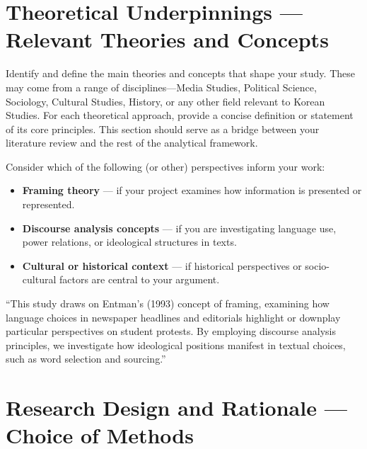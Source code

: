\documentclass[11pt,a4paper]{article}
\begin{document}
\section{Theoretical Underpinnings --- Relevant Theories and Concepts}

Identify and define the main theories and concepts that shape your study. These may come from a range of disciplines---Media Studies, Political Science, Sociology, Cultural Studies, History, or any other field relevant to Korean Studies. For each theoretical approach, provide a concise definition or statement of its core principles. This section should serve as a bridge between your literature review and the rest of the analytical framework.

Consider which of the following (or other) perspectives inform your work:

\begin{itemize}[nosep]
  \item \textbf{Framing theory} --- if your project examines how information is presented or represented.
  \item \textbf{Discourse analysis concepts} --- if you are investigating language use, power relations, or ideological structures in texts.
  \item \textbf{Cultural or historical context} --- if historical perspectives or socio-cultural factors are central to your argument.
\end{itemize}

\begin{examplebox}
``This study draws on Entman's (1993) concept of framing, examining how language choices in newspaper headlines and editorials highlight or downplay particular perspectives on student protests. By employing discourse analysis principles, we investigate how ideological positions manifest in textual choices, such as word selection and sourcing.''\footnotemark
\end{examplebox}


\section{Research Design and Rationale --- Choice of Methods}
\end{document}
